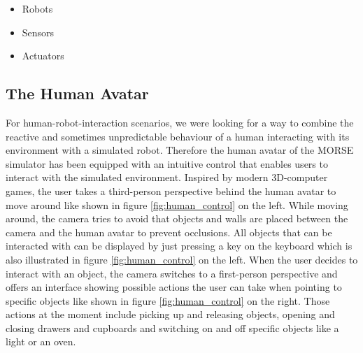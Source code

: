 \documentclass{llncs}
\begin{document}
\begin{itemize}
  \item Robots
  \item Sensors
  \item Actuators
\end{itemize}

\subsection{The Human Avatar}

For human-robot-interaction scenarios, we were looking for a way to combine the reactive and sometimes unpredictable behaviour of a human 
interacting with its environment with a simulated robot. Therefore the human avatar of the MORSE simulator has been equipped with an intuitive 
control that enables users to interact with the simulated environment. Inspired by modern 3D-computer games, the user
takes a third-person perspective behind the human avatar to move around like shown in figure \ref{fig:human_control} on the left. 
While moving around, the camera tries to avoid that objects and walls are placed between the camera and the human avatar to prevent occlusions. 
All objects that can be interacted with can be displayed by just pressing a key on the keyboard which is also illustrated in figure 
\ref{fig:human_control} on the left. When the user decides to interact with an object, the camera switches to a first-person perspective 
and offers an interface showing possible actions the user can take when pointing to specific objects like shown in figure \ref{fig:human_control} 
on the right. Those actions at the moment include picking up and releasing objects, opening and closing drawers and cupboards and switching
on and off specific objects like a light or an oven. 
\end{document}
